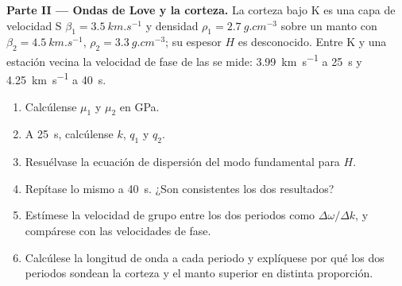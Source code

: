 \begin{problem}
\noindent\textbf{Parte II --- Ondas de Love y la corteza.} La corteza bajo K es una capa
de velocidad S $\beta_1 = \qty{3.5}{km.s^{-1}}$ y densidad
$\rho_1 = \qty{2.7}{g.cm^{-3}}$ sobre un manto con $\beta_2 =
\qty{4.5}{km.s^{-1}}$, $\rho_2 = \qty{3.3}{g.cm^{-3}}$; su espesor $H$ es
desconocido. Entre K y una estación vecina la velocidad de fase de las 
se mide: \qty{3.99}{km.s^{-1}} a \qty{25}{s} y \qty{4.25}{km.s^{-1}} a
\qty{40}{s}.
\begin{enumerate}[resume]
  \item Calcúlense $\mu_1$ y $\mu_2$ en \unit{GPa}.
  \item A \qty{25}{s}, calcúlense $k$, $q_1$ y $q_2$.
  \item Resuélvase la ecuación de dispersión del modo fundamental para $H$.
  \item Repítase lo mismo a \qty{40}{s}. ¿Son consistentes los dos resultados?
  \item Estímese la velocidad de grupo entre los dos periodos como
        $\Delta\omega/\Delta k$, y compárese con las velocidades de fase.
  \item Calcúlese la longitud de onda a cada periodo y explíquese por qué los dos periodos
        sondean la corteza y el manto superior en
        distinta proporción.
\end{enumerate}


\end{problem}
